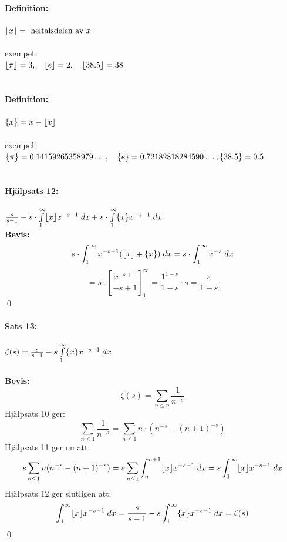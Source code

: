\paragraph{Definition:} $\lfloor x\rfloor = \text{ heltalsdelen av } x$\\
\\
exempel:\\
$\lfloor\pi\rfloor = 3, \quad \lfloor e\rfloor = 2, \quad \lfloor38.5\rfloor = 38$\\
\\
\paragraph{Definition:} $\{x\} = x - \lfloor x\rfloor$\\
\\
exempel:\\
$\{\pi\} = 0.14159265358979 \ldots, \quad \{e\} = 0.72182818284590 \ldots, \{38.5\} = 0.5$\\
\\
\paragraph{Hjälpsats 12:} $\frac {s} {s - 1} - s \cdot \int\limits_1^\infty \lfloor x\rfloor x^{-s - 1} \; dx +
		s \cdot \int\limits_1^\infty \{x\} x^{-s - 1} \; dx$ \\
{\bf Bevis:}\\
\[
	s \cdot \int_1^\infty x^{-s - 1} (\lfloor x\rfloor + \{x\}) \; dx = s \cdot \int_1^\infty x^{-s} \; dx
\]
\[
	= s \cdot \left [
		\frac {x^{-s + 1}} {-s + 1}
	\right ]_1^\infty =
	\frac {1^{1 - s}} {1 - s} \cdot s = \frac {s} {1 - s}
\]
\hfill \qed
\\
\paragraph{Sats 13:} $\zeta(s) = \frac {s} {s - 1} - s \int\limits_1^\infty \{x\} x^{-s - 1} \; dx$\\
\\
{\bf Bevis:}\\
\[
	\zeta(s) = \sum_{n \leq n} \frac {1} {n^{-s}}
\]
Hjälpsats 10 ger:
\[
	\sum_{n \leq 1} \frac {1} {n^{-s}} = \sum_{n \leq 1} n \cdot (n^{-s} - (n + 1)^{-s})
\]
Hjälpsats 11 ger nu att:
\[
	s \sum_{n \leq 1} n (n^{-s} - (n + 1)^{-s}) = s \sum_{n \leq 1} \int_n^{n + 1} \lfloor x\rfloor x^{-s -1} \; dx =
		s \int_1^\infty \lfloor x\rfloor x^{-s - 1} \; dx
\]
Hjälpsats 12 ger slutligen att:
\[
	\int_1^\infty \lfloor x\rfloor x^{-s - 1} \; dx = \frac {s} {s - 1} - s \int_1^\infty \{x\} x^{-s - 1} \; dx = \zeta(s)
\]
\hfill \qed
\\
